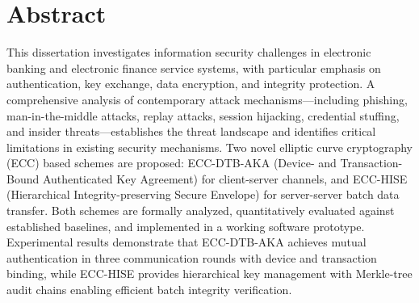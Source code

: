 \chapter*{Abstract}
\label{ch:abstract}

\indent This dissertation investigates information security challenges in electronic banking and electronic finance service systems, with particular emphasis on authentication, key exchange, data encryption, and integrity protection. A comprehensive analysis of contemporary attack mechanisms---including phishing, man-in-the-middle attacks, replay attacks, session hijacking, credential stuffing, and insider threats---establishes the threat landscape and identifies critical limitations in existing security mechanisms. Two novel elliptic curve cryptography (ECC) based schemes are proposed: ECC-DTB-AKA (Device- and Transaction-Bound Authenticated Key Agreement) for client-server channels, and ECC-HISE (Hierarchical Integrity-preserving Secure Envelope) for server-server batch data transfer. Both schemes are formally analyzed, quantitatively evaluated against established baselines, and implemented in a working software prototype. Experimental results demonstrate that ECC-DTB-AKA achieves mutual authentication in three communication rounds with device and transaction binding, while ECC-HISE provides hierarchical key management with Merkle-tree audit chains enabling efficient batch integrity verification.

